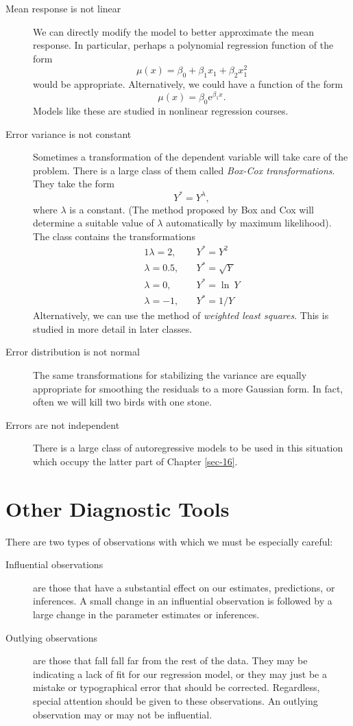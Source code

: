\begin{description}
\item[{Mean response is not linear}] We can directly modify the model to
better approximate the mean response. In particular, perhaps a
polynomial regression function of the form \[ \mu(x) =
     \beta_{0} + \beta_{1}x_{1} + \beta_{2}x_{1}^{2} \] would be
appropriate. Alternatively, we could have a function of the form
\[ \mu(x)=\beta_{0}\mathrm{e}^{\beta_{1}x}.  \] Models like these
are studied in nonlinear regression courses.
\item[{Error variance is not constant}] Sometimes a transformation of the
dependent variable will take care of the problem. There is a
large class of them called \emph{Box-Cox transformations}. They take
the form
\begin{equation}
Y^{\ast}=Y^{\lambda},
\end{equation}
where \(\lambda\) is a constant. (The method proposed by Box and
Cox will determine a suitable value of \(\lambda\) automatically
by maximum likelihood). The class contains the transformations
\begin{alignat*}{1} \lambda=2,\quad &
     Y^{\ast}=Y^{2}\\ \lambda=0.5,\quad &
     Y^{\ast}=\sqrt{Y}\\ \lambda=0,\quad & Y^{\ast}=\ln\:
     Y\\ \lambda=-1,\quad & Y^{\ast}= 1/Y \end{alignat*}
Alternatively, we can use the method of \emph{weighted least
squares}. This is studied in more detail in later classes.
\item[{Error distribution is not normal}] The same transformations for
stabilizing the variance are equally appropriate for smoothing
the residuals to a more Gaussian form. In fact, often we will
kill two birds with one stone.
\item[{Errors are not independent}] There is a large class of
autoregressive models to be used in this situation which occupy
the latter part of Chapter \ref{sec-16}.
\end{description}

\section{Other Diagnostic Tools}
\label{sec-11-5}

There are two types of observations with which we must be especially
careful:
\begin{description}
\item[{Influential observations}] are those that have a substantial effect
on our estimates, predictions, or inferences. A small change in
an influential observation is followed by a large change in the
parameter estimates or inferences.
\item[{Outlying observations}] are those that fall fall far from the rest
of the data. They may be indicating a lack of fit for our
regression model, or they may just be a mistake or typographical
error that should be corrected. Regardless, special attention
should be given to these observations. An outlying observation
may or may not be influential.
\end{description}

